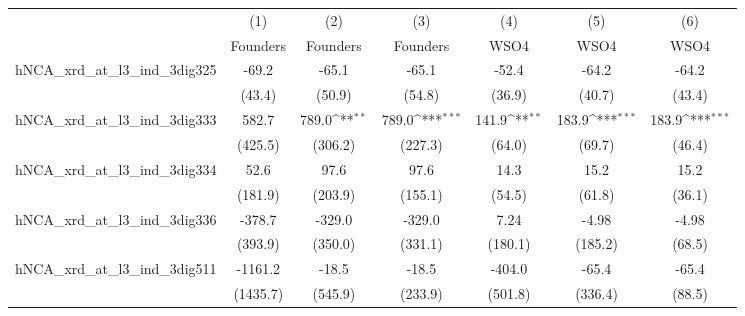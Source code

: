 {
\def\sym#1{\ifmmode^{#1}\else\(^{#1}\)\fi}
\begin{tabular}{l*{6}{c}}
\toprule
                    &\multicolumn{1}{c}{(1)}&\multicolumn{1}{c}{(2)}&\multicolumn{1}{c}{(3)}&\multicolumn{1}{c}{(4)}&\multicolumn{1}{c}{(5)}&\multicolumn{1}{c}{(6)}\\
                    &\multicolumn{1}{c}{Founders}&\multicolumn{1}{c}{Founders}&\multicolumn{1}{c}{Founders}&\multicolumn{1}{c}{WSO4}&\multicolumn{1}{c}{WSO4}&\multicolumn{1}{c}{WSO4}\\
\midrule
hNCA\_xrd\_at\_l3\_ind\_3dig325&       -69.2         &       -65.1         &       -65.1         &       -52.4         &       -64.2         &       -64.2         \\
                    &      (43.4)         &      (50.9)         &      (54.8)         &      (36.9)         &      (40.7)         &      (43.4)         \\
\addlinespace
hNCA\_xrd\_at\_l3\_ind\_3dig333&       582.7         &       789.0\sym{**} &       789.0\sym{***}&       141.9\sym{**} &       183.9\sym{***}&       183.9\sym{***}\\
                    &     (425.5)         &     (306.2)         &     (227.3)         &      (64.0)         &      (69.7)         &      (46.4)         \\
\addlinespace
hNCA\_xrd\_at\_l3\_ind\_3dig334&        52.6         &        97.6         &        97.6         &        14.3         &        15.2         &        15.2         \\
                    &     (181.9)         &     (203.9)         &     (155.1)         &      (54.5)         &      (61.8)         &      (36.1)         \\
\addlinespace
hNCA\_xrd\_at\_l3\_ind\_3dig336&      -378.7         &      -329.0         &      -329.0         &        7.24         &       -4.98         &       -4.98         \\
                    &     (393.9)         &     (350.0)         &     (331.1)         &     (180.1)         &     (185.2)         &      (68.5)         \\
\addlinespace
hNCA\_xrd\_at\_l3\_ind\_3dig511&     -1161.2         &       -18.5         &       -18.5         &      -404.0         &       -65.4         &       -65.4         \\
                    &    (1435.7)         &     (545.9)         &     (233.9)         &     (501.8)         &     (336.4)         &      (88.5)         \\

\end{tabular}}

